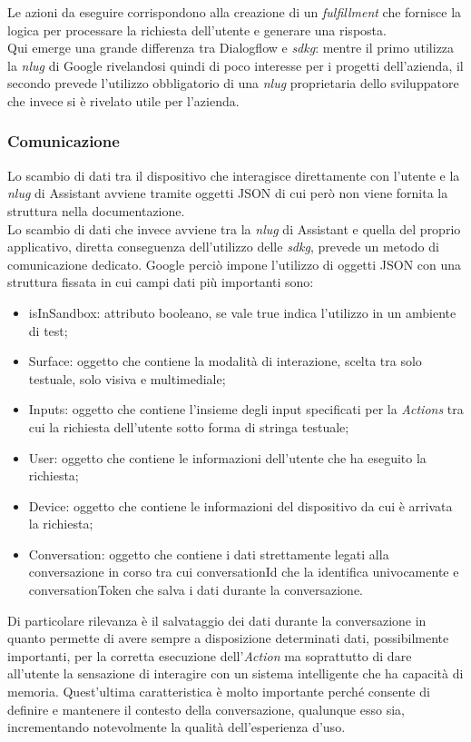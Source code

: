 		Le azioni da eseguire corrispondono alla creazione di un \emph{fulfillment} che fornisce la logica per processare la richiesta dell'utente e generare una risposta. \\
		Qui emerge una grande differenza tra Dialogflow e \emph{\gls{sdkg}}: mentre il primo utilizza la \emph{\gls{nlug}} di Google rivelandosi quindi di poco interesse per i progetti dell'azienda, il secondo prevede l'utilizzo obbligatorio di una \emph{\gls{nlug}} proprietaria dello sviluppatore che invece si è rivelato utile per l'azienda.
		\subsubsection{Comunicazione}
		Lo scambio di dati tra il dispositivo che interagisce direttamente con l'utente e la \emph{\gls{nlug}} di Assistant avviene tramite oggetti JSON di cui però non viene fornita la struttura nella documentazione. \\
		Lo scambio di dati che invece avviene tra la \emph{\gls{nlug}} di Assistant e quella del proprio applicativo, diretta conseguenza dell'utilizzo delle \emph{\gls{sdkg}}, prevede un metodo di comunicazione dedicato. Google perciò impone l'utilizzo di oggetti JSON con una struttura fissata in cui campi dati più importanti sono:
		\begin{itemize}
			\item isInSandbox: attributo booleano, se vale true indica l'utilizzo in un ambiente di test;
			\item Surface: oggetto che contiene la modalità di interazione, scelta tra solo testuale, solo visiva e multimediale;
			\item Inputs: oggetto che contiene l'insieme degli input specificati per la \emph{Actions} tra cui la richiesta dell'utente sotto forma di stringa testuale;
			\item User: oggetto che contiene le informazioni dell'utente che ha eseguito la richiesta;
			\item Device: oggetto che contiene le informazioni del dispositivo da cui è arrivata la richiesta;
			\item Conversation: oggetto che contiene i dati strettamente legati alla conversazione in corso tra cui conversationId che la identifica univocamente e conversationToken che salva i dati durante la conversazione.
		\end{itemize}
		Di particolare rilevanza è il salvataggio dei dati durante la conversazione in quanto permette di avere sempre a disposizione determinati dati, possibilmente importanti, per la corretta esecuzione dell'\emph{Action} ma soprattutto di dare all'utente la sensazione di interagire con un sistema intelligente che ha capacità di memoria. Quest'ultima caratteristica è molto importante perché consente di definire e mantenere il contesto della conversazione, qualunque esso sia, incrementando notevolmente la qualità dell'esperienza d'uso. \\
